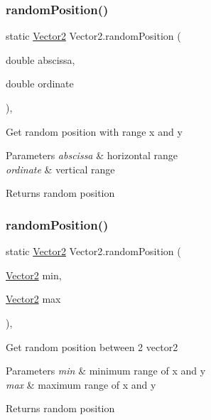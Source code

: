 \subsubsection{\texorpdfstring{random\+Position()}{randomPosition()}\hspace{0.1cm}{\footnotesize\ttfamily [1/2]}}
{\footnotesize\ttfamily static \mbox{\hyperlink{class_vector2}{Vector2}} Vector2.\+random\+Position (\begin{DoxyParamCaption}\item[{double}]{abscissa,  }\item[{double}]{ordinate }\end{DoxyParamCaption})\hspace{0.3cm}{\ttfamily [inline]}, {\ttfamily [static]}}

Get random position with range x and y 
\begin{DoxyParams}{Parameters}
{\em abscissa} & horizontal range \\
\hline
{\em ordinate} & vertical range \\
\hline
\end{DoxyParams}
\begin{DoxyReturn}{Returns}
random position 
\end{DoxyReturn}
\mbox{\label{class_vector2_af7e6ce10063a75db5bba6eac52dfe790}} 
\subsubsection{\texorpdfstring{random\+Position()}{randomPosition()}\hspace{0.1cm}{\footnotesize\ttfamily [2/2]}}
{\footnotesize\ttfamily static \mbox{\hyperlink{class_vector2}{Vector2}} Vector2.\+random\+Position (\begin{DoxyParamCaption}\item[{\mbox{\hyperlink{class_vector2}{Vector2}}}]{min,  }\item[{\mbox{\hyperlink{class_vector2}{Vector2}}}]{max }\end{DoxyParamCaption})\hspace{0.3cm}{\ttfamily [inline]}, {\ttfamily [static]}}

Get random position between 2 vector2 
\begin{DoxyParams}{Parameters}
{\em min} & minimum range of x and y \\
\hline
{\em max} & maximum range of x and y \\
\hline
\end{DoxyParams}
\begin{DoxyReturn}{Returns}
random position 
\end{DoxyReturn}
\mbox{\label{class_vector2_a315ad636760344cbf563e7d71c910c4b}} 
